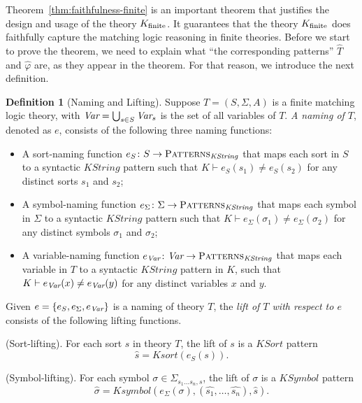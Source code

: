 \documentclass[UTF8,11pt]{article}
\newcounter{thmcounter}
\theoremstyle{plain}
\theoremstyle{definition}
\newtheorem{definition} [thmcounter]{Definition}
\theoremstyle{remark}
\newcommand{\PATTERNS}{\text{P\textsc{atterns}}}
\newcommand{\KString}{\mathit{KString}}
\newcommand{\KSort}{\mathit{KSort}}
\newcommand{\Ksort}{\mathit{Ksort}}
\newcommand{\KSymbol}{\mathit{KSymbol}}
\newcommand{\Ksymbol}{\mathit{Ksymbol}}
\begin{document}
Theorem~\ref{thm:faithfulness-finite} is an important theorem that justifies the design and usage of the theory ${K_\text{finite}}$. 
It guarantees that the theory ${K_\text{finite}}$ does faithfully capture the matching logic reasoning in finite theories.
Before we start to prove the theorem, we need to explain what ``the corresponding patterns'' $\hat{T}$ and $\hat{\varphi}$ are, as they appear in the theorem.
For that reason, we introduce the next definition.

\begin{definition}[Naming and Lifting]
	Suppose $T = (S, \Sigma, A)$ is a finite matching logic theory, with $\textit{Var} = \bigcup_{s \in S} \textit{Var}_s$ is the set of all variables of $T$.
	\emph{A naming of $T$}, denoted as $e$, consists of the following three naming functions:
	\begin{itemize}
		\item A sort-naming function $e_S \colon S \to \PATTERNS_\KString$ that maps each sort in $S$ to a syntactic $\KString$ pattern such that $K \vdash e_S(s_1) \neq e_S(s_2)$ for any distinct sorts $s_1$ and $s_2$;
		\item A symbol-naming function $e_\Sigma \colon \Sigma \to \PATTERNS_\KString$ that maps each symbol in $\Sigma$ to a syntactic $\KString$ pattern such that $K \vdash e_\Sigma(\sigma_1) \neq e_\Sigma(\sigma_2)$ for any distinct symbols $\sigma_1$ and $\sigma_2$;
		\item A variable-naming function $e_\Var \colon \Var \to \PATTERNS_\KString$ that maps each variable in $T$ to a syntactic $\KString$ pattern in $K$, such that $K \vdash e_{\textit{Var}}(x) \neq e_{\textit{Var}}(y)$ for any distinct variables $x$ and $y$.
	\end{itemize}

    Given $e = \{e_S, e_\Sigma, e_{\textit{Var}} \}$ is a naming of theory $T$, the \emph{lift of $T$ with respect to $e$} consists of the following lifting functions.
    
    (Sort-lifting).
    For each sort $s$ in theory $T$, the lift of $s$ is a $\KSort$ pattern
    $$ \hat{s} = \Ksort(e_S(s)).$$
    
    (Symbol-lifting).
    For each symbol $\sigma \in \Sigma_{s_1 \dots s_n, s}$, the lift of $\sigma$ is a $\KSymbol$ pattern 
    $$ \hat{\sigma} = \Ksymbol(e_\Sigma(\sigma), (\hat{s_1}, \dots, \hat{s_n}), \hat{s}).$$
    

\end{definition}
\end{document}
